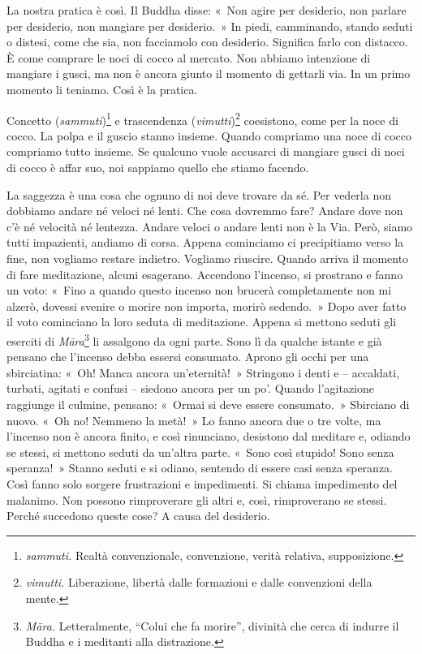 La nostra pratica è così. Il Buddha disse: «~Non agire per desiderio,
non parlare per desiderio, non mangiare per desiderio.~» In piedi,
camminando, stando seduti o distesi, come che sia, non facciamolo con
desiderio. Significa farlo con distacco. È come comprare le noci di
cocco al mercato. Non abbiamo intenzione di mangiare i gusci, ma non è
ancora giunto il momento di gettarli via. In un primo momento li
teniamo. Così è la pratica.

Concetto (\emph{sammuti})\footnote{\emph{sammuti.}
  Realtà convenzionale, convenzione, verità relativa, supposizione.} e
trascendenza (\emph{vimutti})\footnote{\emph{vimutti.} Liberazione,
  libertà dalle formazioni e dalle convenzioni della mente.} coesistono,
come per la noce di cocco. La polpa e il guscio stanno insieme. Quando
compriamo una noce di cocco compriamo tutto insieme. Se qualcuno vuole
accusarci di mangiare gusci di noci di cocco è affar suo, noi sappiamo
quello che stiamo facendo.

La saggezza è una cosa che ognuno di noi deve trovare da sé. Per vederla
non dobbiamo andare né veloci né lenti. Che cosa dovremmo fare? Andare
dove non c'è né velocità né lentezza. Andare veloci o andare lenti non è
la Via. Però, siamo tutti impazienti, andiamo di corsa. Appena
cominciamo ci precipitiamo verso la fine, non vogliamo restare indietro.
Vogliamo riuscire. Quando arriva il momento di fare meditazione, alcuni
esagerano. Accendono l'incenso, si prostrano e fanno un voto: «~Fino a
quando questo incenso non brucerà completamente non mi alzerò, dovessi
svenire o morire non importa, morirò sedendo.~» Dopo aver fatto il voto
cominciano la loro seduta di meditazione. Appena si mettono seduti gli
eserciti di \emph{Māra}\footnote{\emph{Māra.} Letteralmente, ``Colui che
  fa morire'', divinità che cerca di indurre il Buddha e i meditanti
  alla distrazione.} li assalgono da ogni parte. Sono lì da qualche
istante e già pensano che l'incenso debba essersi consumato. Aprono gli
occhi per una sbirciatina: «~Oh! Manca ancora un'eternità!~» Stringono i
denti e -- accaldati, turbati, agitati e confusi -- siedono ancora per
un po'. Quando l'agitazione raggiunge il culmine, pensano: «~Ormai si
deve essere consumato.~» Sbirciano di nuovo. «~Oh no! Nemmeno la metà!~»
Lo fanno ancora due o tre volte, ma l'incenso non è ancora finito, e
così rinunciano, desistono dal meditare e, odiando se stessi, si mettono
seduti da un'altra parte. «~Sono così stupido! Sono senza speranza!~»
Stanno seduti e si odiano, sentendo di essere casi senza speranza. Così
fanno solo sorgere frustrazioni e impedimenti. Si chiama impedimento del
malanimo. Non possono rimproverare gli altri e, così, rimproverano se
stessi. Perché succedono queste cose? A causa del desiderio.

